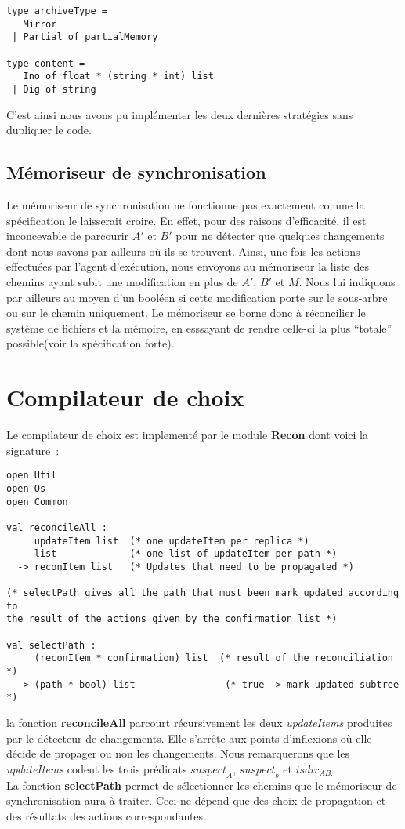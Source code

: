 \documentclass[11pt]{report}
\newcommand{\sus}[1]{\ensuremath{\mathit{suspect}_{#1}}}
\newcommand{\isdira}[2]{\ensuremath{\mathit{isdir}_{#1#2}}}
\newcommand{\data}[1]{\emph{#1}}
\newcommand{\func}[1]{\textbf{#1}}
\newcommand{\modu}[1]{\textbf{#1}}
\begin{document}
{\begin{verbatim}
type archiveType =
   Mirror
 | Partial of partialMemory

type content =
   Ino of float * (string * int) list
 | Dig of string 
\end{verbatim}
C'est ainsi nous avons pu impl\'ementer les deux derni\`eres strat\'egies sans dupliquer le code.
\subsection{M\'emoriseur de synchronisation}
Le m\'emoriseur de synchronisation ne fonctionne pas exactement comme la sp\'ecification le laisserait croire.
En effet, pour des raisons d'efficacit\'e, il est inconcevable de parcourir $A'$ et $B'$ pour ne d\'etecter
que quelques changements dont nous savons par ailleurs o\`u ils se trouvent. Ainsi, une fois les actions effectu\'ees
par l'agent d'ex\'ecution, nous envoyons au m\'emoriseur la liste des chemins ayant subit une modification
en plus de $A'$, $B'$ et  $M$. Nous lui indiquons par ailleurs au moyen d'un bool\'een si cette modification porte
sur le sous-arbre ou sur le chemin uniquement. Le m\'emoriseur se borne donc \`a r\'econcilier le syst\`eme de
fichiers et la m\'emoire, en esssayant de rendre celle-ci la plus ``totale''
possible(voir la sp\'ecification forte).
\section{Compilateur de choix}
\label{reconciler}
Le compilateur de choix est implement\'e par le module \modu{Recon} dont
voici la signature~:
\begin{verbatim}
open Util
open Os
open Common  

val reconcileAll : 
     updateItem list  (* one updateItem per replica *)
     list             (* one list of updateItem per path *)
  -> reconItem list   (* Updates that need to be propagated *)

(* selectPath gives all the path that must been mark updated according to
the result of the actions given by the confirmation list *)

val selectPath : 
     (reconItem * confirmation) list  (* result of the reconciliation *)
  -> (path * bool) list                (* true -> mark updated subtree *)
\end{verbatim} 
la fonction \func{reconcileAll} parcourt r\'ecursivement les deux \data{updateItems}
produites par le d\'etecteur de changements. Elle s'arr\^ete aux points
d'inflexions o\`u elle d\'ecide de propager ou non les changements.
Nous remarquerons que les \data{updateItems} codent les trois pr\'edicats 
\sus{A}, \sus{b} et \isdira{AB}.\\
La fonction \func{selectPath} permet de s\'electionner les chemins que
le m\'emoriseur de synchronisation aura \`a traiter. Ceci ne d\'epend que des
choix de propagation et des r\'esultats des actions correspondantes.
}
\end{document}

